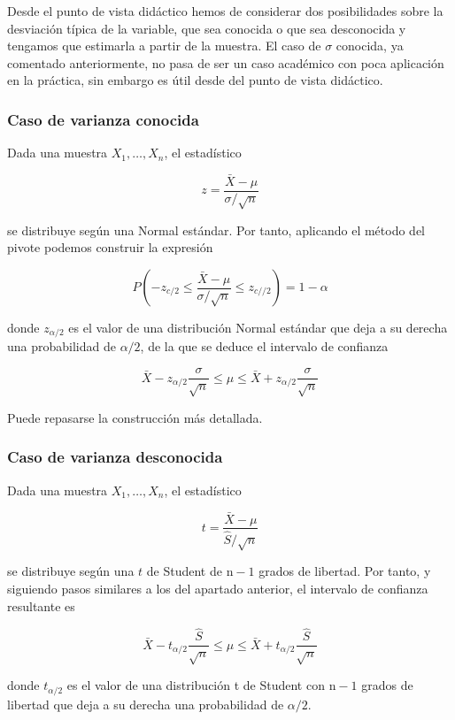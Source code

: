 \documentclass[
]{article}
\begin{document}
Desde el punto de vista didáctico hemos de considerar dos posibilidades sobre la desviación típica de la variable, que sea conocida o que sea desconocida y tengamos que estimarla a partir de la muestra. El caso de \(\sigma\) conocida, ya comentado anteriormente, no pasa de ser un caso académico con poca aplicación en la práctica, sin embargo es útil desde del punto de vista didáctico.

\subsubsection{Caso de varianza conocida}\label{caso-de-varianza-conocida}

Dada una muestra \(X_{1}, \ldots, X_{n}\), el estadístico

\[
z=\frac{\bar{X}-\mu}{\sigma / \sqrt{n}}
\]

se distribuye según una Normal estándar. Por tanto, aplicando el método del pivote podemos construir la expresión

\[
P\left(-z_{c / 2} \leq \frac{\bar{X}-\mu}{\sigma / \sqrt{n}} \leq z_{c / / 2}\right)=1-\alpha
\]

donde \(z_{\alpha / 2}\) es el valor de una distribución Normal estándar que deja a su derecha una probabilidad de \(\alpha / 2\), de la que se deduce el intervalo de confianza

\[
\bar{X}-z_{\alpha / 2} \frac{\sigma}{\sqrt{n}} \leq \mu \leq \bar{X}+z_{\alpha / 2} \frac{\sigma}{\sqrt{n}}
\]

Puede repasarse la construcción más detallada.

\subsubsection{Caso de varianza desconocida}\label{caso-de-varianza-desconocida}

Dada una muestra \(X_{1}, \ldots, X_{n}\), el estadístico

\[
t=\frac{\bar{X}-\mu}{\hat{S} / \sqrt{n}}
\]

se distribuye según una \(t\) de Student de \(\mathrm{n}-1\) grados de libertad. Por tanto, y siguiendo pasos similares a los del apartado anterior, el intervalo de confianza resultante es

\[
\bar{X}-t_{\alpha / 2} \frac{\hat{S}}{\sqrt{n}} \leq \mu \leq \bar{X}+t_{\alpha / 2} \frac{\hat{S}}{\sqrt{n}}
\]

donde \(t_{\alpha / 2}\) es el valor de una distribución t de Student con \(\mathrm{n}-1\) grados de libertad que deja a su derecha una probabilidad de \(\alpha / 2\).
\end{document}
